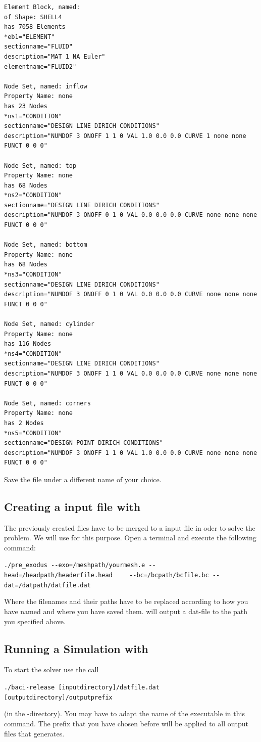  \begin{small} \begin{verbatim}
Element Block, named: 
of Shape: SHELL4
has 7058 Elements
*eb1="ELEMENT"
sectionname="FLUID"
description="MAT 1 NA Euler"
elementname="FLUID2"

Node Set, named: inflow
Property Name: none
has 23 Nodes
*ns1="CONDITION"
sectionname="DESIGN LINE DIRICH CONDITIONS"
description="NUMDOF 3 ONOFF 1 1 0 VAL 1.0 0.0 0.0 CURVE 1 none none FUNCT 0 0 0"

Node Set, named: top
Property Name: none
has 68 Nodes
*ns2="CONDITION"
sectionname="DESIGN LINE DIRICH CONDITIONS"
description="NUMDOF 3 ONOFF 0 1 0 VAL 0.0 0.0 0.0 CURVE none none none FUNCT 0 0 0"

Node Set, named: bottom
Property Name: none
has 68 Nodes
*ns3="CONDITION"
sectionname="DESIGN LINE DIRICH CONDITIONS"
description="NUMDOF 3 ONOFF 0 1 0 VAL 0.0 0.0 0.0 CURVE none none none FUNCT 0 0 0"

Node Set, named: cylinder
Property Name: none
has 116 Nodes
*ns4="CONDITION"
sectionname="DESIGN LINE DIRICH CONDITIONS"
description="NUMDOF 3 ONOFF 1 1 0 VAL 0.0 0.0 0.0 CURVE none none none FUNCT 0 0 0"

Node Set, named: corners
Property Name: none
has 2 Nodes
*ns5="CONDITION"
sectionname="DESIGN POINT DIRICH CONDITIONS"
description="NUMDOF 3 ONOFF 1 1 0 VAL 1.0 0.0 0.0 CURVE none none none FUNCT 0 0 0"
 \end{verbatim} \end{small}
Save the file under a different name of your choice.

\subsection{Creating a \baci{} input file with \prexo}
The previously created files have to be merged to a \baci{} input file in oder 
to solve the problem. We will use \prexo for this purpose. Open a terminal 
and execute the following command:
\begin{center}
  \verb|./pre_exodus --exo=/meshpath/yourmesh.e --head=/headpath/headerfile.head|
  \verb|	--bc=/bcpath/bcfile.bc --dat=/datpath/datfile.dat|
\end{center}
Where the filenames and their paths have to be replaced according to how you have named and where you have saved them.
\prexo will output a dat-file to the path you specified above.


\subsection{Running a Simulation with \baci{}}
\label{tut_fluid_preexo:baci}
To start the solver use the call 
\begin{center}
	\verb|./baci-release [inputdirectory]/datfile.dat [outputdirectory]/outputprefix|
\end{center}
(in the \baci{}-directory). You may have to adapt the name of the executable 
in this command. The prefix that you have chosen before will 
be applied to all output files that \baci{} generates.


